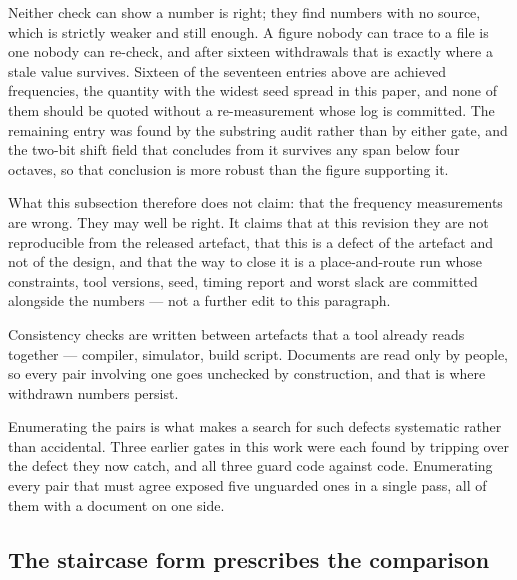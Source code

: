 Neither check can show a number is right; they find numbers with no source, which
is strictly weaker and still enough. A figure nobody can trace to a file is one
nobody can re-check, and after sixteen withdrawals that is exactly where a stale
value survives. Sixteen of the seventeen entries above are achieved frequencies,
the quantity with the widest seed spread in this paper, and none of them should be
quoted without a re-measurement whose log is committed. The remaining entry was
found by the substring audit rather than by either gate, and the two-bit shift
field that  concludes from it survives any span below
four octaves, so that conclusion is more robust than the figure supporting it.

What this subsection therefore does not claim: that the frequency measurements are
wrong. They may well be right. It claims that at this revision they are not
reproducible from the released artefact, that this is a defect of the artefact and
not of the design, and that the way to close it is a place-and-route run whose
constraints, tool versions, seed, timing report and worst slack are committed
alongside the numbers --- not a further edit to this paragraph.

\begin{theorem}
\label{thm:doctrace}
Consistency checks are written between artefacts that a tool already reads
together --- compiler, simulator, build script. Documents are read only by
people, so every pair involving one goes unchecked by construction, and that is
where withdrawn numbers persist.
\end{theorem}

Enumerating the pairs is what makes a search for such defects systematic rather
than accidental. Three earlier gates in this work were each found by tripping
over the defect they now catch, and all three guard code against code.
Enumerating every pair that must agree exposed five unguarded ones in a single
pass, all of them with a document on one side.



\subsection{The staircase form prescribes the comparison}

